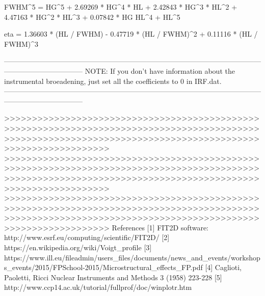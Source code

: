 FWHM^5 = HG^5 + 2.69269 * HG^4 * HL + 2.42843 * HG^3 * HL^2 + 4.47163 * HG^2 * HL^3 + 0.07842 * HG HL^4 + HL^5

eta = 1.36603 * (HL / FWHM) - 0.47719 * (HL / FWHM)^2 + 0.11116 * (HL / FWHM)^3

---------------------------------------------------------------------------------------------------------------------------------------------
NOTE: If you don't have information about the instrumental broeadening, just set all the coefficients to 0 in IRF.dat.
---------------------------------------------------------------------------------------------------------------------------------------------
 
>>>>>>>>>>>>>>>>>>>>>>>>>>>>>>>>>>>>>>>>>>>>>>>>>>>>>>>>>>>>>>>>>>>>>>>>>>>>>>>>>>>>>>>>>>>>>>>>>>>>>>>>>>>>>>>>>>>>>>>>>>>>>>>>>>>>>>>>>>>>>>>>>>>>>>>>>>>>>
>>>>>>>>>>>>>>>>>>>>>>>>>>>>>>>>>>>>>>>>>>>>>>>>>>>>>>>>>>>>>>>>>>>>>>>>>>>>>>>>>>>>>>>>>>>>>>>>>>>>>>>>>>>>>>>>>>>>>>>>>>>>>>>>>>>>>>>>>>>>>>>>>>>>>>>>>>>>>
>>>>>>>>>>>>>>>>>>>>>>>>>>>>>>>>>>>>>>>>>>>>>>>>>>>>>>>>>>>>>>>>>>>>>>>>>>>>>>>>>>>>>>>>>>>>>>>>>>>>>>>>>>>>>>>>>>>>>>>>>>>>>>>>>>>>>>>>>>>>>>>>>>>>>>>>>>>>>
References
[1] FIT2D software: http://www.esrf.eu/computing/scientific/FIT2D/
[2] https://en.wikipedia.org/wiki/Voigt_profile
[3] https://www.ill.eu/fileadmin/users_files/documents/news_and_events/workshops_events/2015/FPSchool-2015/Microstructural_effects_FP.pdf
[4] Caglioti, Paoletti, Ricci Nuclear Instruments and Methods 3 (1958) 223-228
[5] http://www.ccp14.ac.uk/tutorial/fullprof/doc/winplotr.htm
